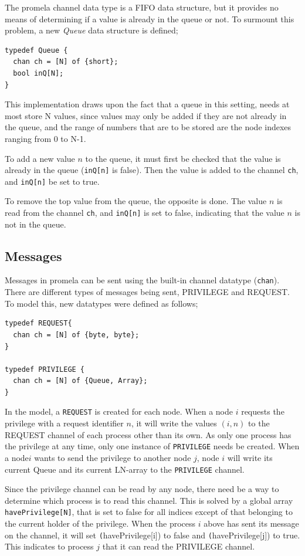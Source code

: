 \documentclass[a4paper,12pt]{llncs}
\begin{document}
The promela channel data type is a FIFO data structure, but it provides no means of determining if a value is already in the queue or not. To surmount this problem, a new \emph{Queue} data structure is defined;

\begin{lstlisting}
typedef Queue {
  chan ch = [N] of {short};
  bool inQ[N];
}
\end{lstlisting}

This implementation draws upon the fact that a queue in this setting, needs at most store N values, since values may only be added if they are not already in the queue, and the range of numbers that are to be stored are the node indexes ranging from 0 to N-1.

To add a new value $n$ to the queue, it must first be checked that the value is already in the queue (\texttt{inQ[n]} is false). Then the value is added to the channel \texttt{ch}, and \texttt{inQ[n]} be set to true.

To remove the top value from the queue, the opposite is done. The value $n$ is read from the channel \texttt{ch}, and \texttt{inQ[n]} is set to false, indicating that the value $n$ is not in the queue.

\subsection{Messages}
Messages in promela can be sent using the built-in channel datatype (\texttt{chan}). There are different types of messages being sent, PRIVILEGE and REQUEST. To model this, new datatypes were defined as follows;

\begin{lstlisting}
typedef REQUEST{
  chan ch = [N] of {byte, byte};
}

typedef PRIVILEGE {
  chan ch = [N] of {Queue, Array};
}

\end{lstlisting}


In the model, a \texttt{REQUEST} is created for each node. When a node $i$ requests the privilege with a request identifier $n$, it will write the values $(i,n)$ to the REQUEST channel of each process other than its own. As only one process has the privilege at any time, only one instance of \texttt{PRIVILEGE} needs be created. When a node$i$ wants to send the privilege to another node $j$, node $i$ will write its current Queue and its current LN-array to the \texttt{PRIVILEGE} channel.

Since the privilege channel can be read by any node, there need be a way to determine which process is to read this channel. This is solved by a global array \texttt{havePrivilege[N]}, that is set to false for all indices except of that belonging to the current holder of the privilege. When the process $i$ above has sent its message on the channel, it will set \texttt (havePrivilege[i]) to false and \texttt (havePrivilege[j]) to true. This indicates to process $j$ that it can read the PRIVILEGE channel.
\end{document}
